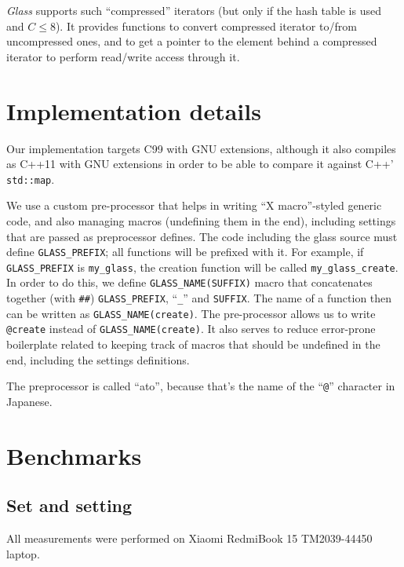\documentclass[a4paper,12pt]{article}
\begin{document}
\textit{Glass} supports such ``compressed'' iterators (but only if the hash table is used and $C \le 8$).
It provides functions to convert compressed iterator to/from uncompressed ones,
and to get a pointer to the element behind a compressed iterator to perform read/write access through it.

\section{Implementation details}

Our implementation targets C99 with GNU extensions, although it also compiles as C++11 with GNU extensions
in order to be able to compare it against C++' \texttt{std::map}.

We use a custom pre-processor that helps in writing ``X macro''-styled generic code,
and also managing macros (undefining them in the end), including settings that are passed as preprocessor defines.
The code including the glass source must define \texttt{GLASS\_PREFIX};
all functions will be prefixed with it. For example, if \texttt{GLASS\_PREFIX} is \texttt{my\_glass},
the creation function will be called \texttt{my\_glass\_create}.
In order to do this, we define \texttt{GLASS\_NAME(SUFFIX)} macro that concatenates
together (with \texttt{\#\#}) \texttt{GLASS\_PREFIX}, ``\texttt{\_}'' and \texttt{SUFFIX}.
The name of a function then can be written as \texttt{GLASS\_NAME(create)}.
The pre-processor allows us to write \texttt{@create} instead of \texttt{GLASS\_NAME(create)}.
It also serves to reduce error-prone boilerplate related to keeping track of macros that should be
undefined in the end, including the settings definitions.

The preprocessor is called ``ato'', because that's the name of the ``\texttt{@}'' character in Japanese.

\section{Benchmarks}

\subsection{Set and setting}

All measurements were performed on Xiaomi RedmiBook 15 TM2039-44450 laptop.
\end{document}
